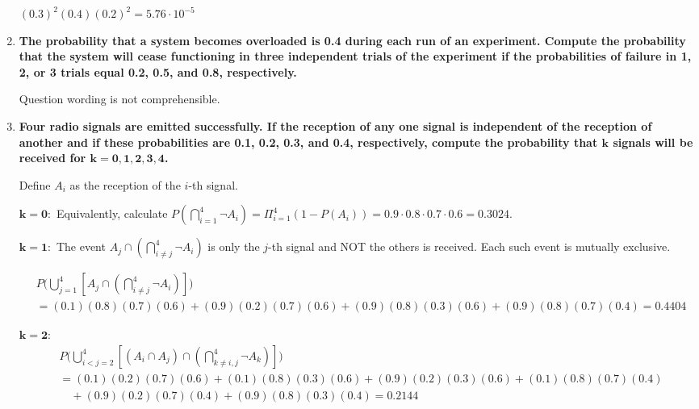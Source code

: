 \documentclass[10pt, oneside]{article}
\begin{document}
\begin{enumerate}[label=3.\arabic*]
$(0.3)^2 (0.4) (0.2)^2 = \boxed{5.76 \cdot 10^{-5}}$

\item  \begin{tcolorbox}[
  colback=Cerulean!5!white,
  colframe=Cerulean!75!black]
\textbf{The probability that a system becomes overloaded is 0.4 during each run of an experiment. Compute the probability that the system will cease functioning in three independent trials of the experiment if the probabilities of failure in 1, 2, or 3 trials equal 0.2, 0.5, and 0.8, respectively.}
\end{tcolorbox}

Question wording is not comprehensible.

\item  \begin{tcolorbox}[
  colback=Cerulean!5!white,
  colframe=Cerulean!75!black]
\textbf{Four radio signals are emitted successfully. If the reception of any one signal is independent of the reception of another and if these probabilities are 0.1, 0.2, 0.3, and 0.4, respectively, compute the probability that $\bm{k}$ signals will be received for $\bm{k = 0, 1, 2, 3, 4}$.}
\end{tcolorbox}

Define $A_i$ as the reception of the $i$-th signal.

$\bm{k = 0}:$ Equivalently, calculate $P(\bigcap^4_{i=1} \neg A_i) = \Pi^4_{i = 1} (1 - P(A_i)) = 0.9 \cdot 0.8 \cdot 0.7 \cdot 0.6 = \boxed{0.3024}$.

$\bm{k = 1}:$ The event $A_j \cap ( \bigcap^4_{i \neq j} \neg A_i )$ is only the $j$-th signal and NOT the others is received. Each such event is mutually exclusive.

\begin{align*}
&P\Bigg( \bigcup^4_{j = 1} [ A_j \cap ( \bigcap^4_{i \neq j} \neg A_i ) ] \Bigg) \\
&= (0.1)(0.8)(0.7)(0.6) + (0.9)(0.2)(0.7)(0.6) + (0.9)(0.8)(0.3)(0.6) + (0.9)(0.8)(0.7)(0.4) = \boxed{0.4404}
\end{align*}

$\bm{k = 2}:$ 
\begin{align*}
&P\Bigg( \bigcup^4_{i < j = 2} [ (A_i \cap A_j) \cap ( \bigcap^4_{k \neq i, j} \neg A_k) ] \Bigg) \\
&= (0.1)(0.2)(0.7)(0.6) + (0.1)(0.8)(0.3)(0.6) + (0.9)(0.2)(0.3)(0.6) + (0.1)(0.8)(0.7)(0.4) \\
&\quad + (0.9)(0.2)(0.7)(0.4) + (0.9)(0.8)(0.3)(0.4) = \boxed{0.2144}
\end{align*}


\end{enumerate}
\end{document}
